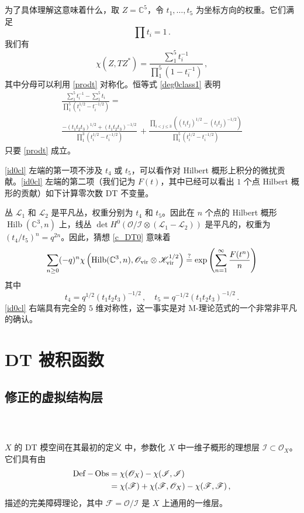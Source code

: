 \documentclass[12pt]{article}
\newcommand{\C}{\mathbb{C}}
\newcommand{\cO}{\mathscr{O}}
\newcommand{\cL}{\mathscr{L}}
\newcommand{\Ovir}{\mathscr{O}_{\textup{vir}}}
\newcommand{\Kvir}{\mathscr{K}_{\textup{vir}}}
\DeclareMathOperator{\Hilb}{Hilb}
\DeclareMathOperator{\Def}{Def}
\DeclareMathOperator{\Obs}{Obs}
\newcommand{\cF}{\mathscr{F}}
\newcommand{\cI}{\mathscr{I}}
\theoremstyle{definition}
\begin{document}
\subsubsection{\ }
为了具体理解这意味着什么，取 $Z=\C^5$，令 $t_1,\dots,t_5$ 为坐标方向的权重。它们满足
\begin{equation}
  \label{prodt}
\prod t_i =1 \,.
\end{equation}
我们有
$$
\chi(Z,TZ^*) = \frac{\sum_1^5 t_i^{-1}}{\prod_1^5 (1-t_i^{-1})} \,,
$$
其中分母可以利用 \eqref{prodt} 对称化。恒等式 \eqref{deg0class1} 表明
\begin{multline}
\frac{\sum_1^5 t_i^{-1}-\sum_1^5 t_i}{\prod_1^5 (t_i^{1/2}-t_i^{-1/2})}
= \\
\frac{-(t_1 t_2 t_3)^{1/2}+(t_1 t_2 t_3)^{-1/2}}
{\prod_1^3 (t_i^{1/2}-t_i^{-1/2})} \, +
\frac{\prod_{i<j\le 3}  \left((t_i t_j)^{1/2}-(t_i t_j)^{-1/2}\right)}
{\prod_1^5 (t_i^{1/2}-t_i^{-1/2})}\label{id0cl}
\end{multline}
只要 \eqref{prodt} 成立。

\eqref{id0cl} 左端的第一项不涉及 $t_4$ 或 $t_5$，可以看作对 Hilbert 概形上积分的微扰贡献。\eqref{id0cl} 左端的第二项（我们记为 $F(t)$，其中已经可以看出 $1$ 个点 Hilbert 概形的贡献）如下计算零次数 DT 不变量。

丛 $\cL_1$ 和 $\cL_2$ 是平凡丛，权重分别为 $t_4$ 和 $t_5$。因此在 $n$ 个点的 Hilbert 概形 $\Hilb(\C^3,n)$ 上，线丛 $\det H^0(\cO/\cI \otimes(\cL_1-\cL_2))$ 是平凡的，权重为 $(t_4/t_5)^n=q^{2n}$。因此，猜想 \ref{c_DT0} 意味着
$$
\sum_{n\ge 0} (-q)^n \chi\left(\Hilb(\C^3,n), \Ovir \otimes
\Kvir^{1/2}\right) \overset?=
\exp \left( \sum_{n=1}^{\infty} \frac{F(t^n)}{n} \right)
$$
其中
$$
t_4 = q^{1/2} (t_1 t_2 t_3)^{-1/2} \,, \quad
t_5 = q^{-1/2} (t_1 t_2 t_3)^{-1/2} \,.
$$
\eqref{id0cl} 右端具有完全的 $5$ 维对称性，这一事实是对 M-理论范式的一个非常非平凡的确认。
\section{DT 被积函数}\label{s_DT}

\subsection{修正的虚拟结构层}

\subsubsection{\ }

$X$ 的 DT 模空间在其最初的定义 \cite{Thom} 中，参数化 $X$ 中一维子概形的理想层 $\cI \subset \cO_X$。它们具有由
\begin{align}
\Def - \Obs &= \chi(\cO_X) - \chi(\cI,\cI) \label{defI}
\\
 &= \chi(\cF) + \chi(\cF,\cO_X) - \chi(\cF,\cF) \notag\,,
\end{align}
描述的完美障碍理论，其中 $\cF = \cO/\cI$ 是 $X$ 上通用的一维层。
\end{document}
